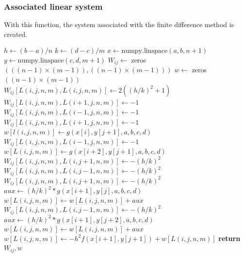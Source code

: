 \documentclass[a4paper]{article}
\begin{document}
\subsubsection{Associated linear system}
With this function, the system associated with the finite difference method is created.
\begin{algorithm}[H]
\caption{Finite Difference Linear System}\label{alg::finite_difference}
\begin{algorithmic}[H]
\State $h \gets (b-a)/n$
\State $k \gets (d-c)/m$
\State $x \gets \text{numpy.linspace}(a, b, n+1)$
\State $y \gets \text{numpy.linspace}(c, d, m+1)$
\State $W_{ij} \gets$ zeros $(((n-1)\times(m-1)),((n-1)\times(m-1)))$
\State $w \gets$ zeros $((n-1)\times(m-1))$
\State $W_{ij}[L(i,j,n,m), L(i,j,n,m)] \gets 2((h/k)^2 + 1)$
\State $W_{ij}[L(i,j,n,m), L(i+1,j,n,m)] \gets -1$
\State $W_{ij}[L(i,j,n,m), L(i-1,j,n,m)] \gets -1$
\Else
{}
\State $W_{ij}[L(i,j,n,m), L(i+1,j,n,m)] \gets -1$
\State $w[l(i,j,n,m)] \gets g(x[i], y[j+1], a, b, c, d)$
\EndIf
{}
\State $W_{ij}[L(i,j,n,m), L(i-1,j,n,m)] \gets -1$
\State $w[L(i,j,n,m)] \gets g(x[i+2], y[j+1], a, b, c, d)$
\EndIf
\EndIf
{}
\State $W_{ij}[L(i,j,n,m), L(i,j+1,n,m)] \gets-(h/k)^2$
\State $W_{ij}[L(i,j,n,m), L(i,j-1,n,m)] \gets-(h/k)^2$
\Else
{}
\State $W_{ij}[L(i,j,n,m), L(i,j+1,n,m)] \gets -(h/k)^2$
\State $aux\gets (h/k)^2*g(x[i+1],y[j],a,b,c,d)$
\State $w[L(i,j,n,m)] \gets w[L(i,j,n,m)]+ aux$
\EndIf
{}
\State $W_{ij}[L(i,j,n,m), L(i,j-1,n,m)] \gets -(h/k)^2$
\State $aux\gets (h/k)^2*g(x[i+1],y[j+2],a,b,c,d)$
\State $w[L(i,j,n,m)] \gets w[L(i,j,n,m)]+ aux$
\EndIf
\EndIf
\State $w[L(i,j,n,m)] \gets-h^2f(x[i+1],y[j+1])+w[L(i,j,n,m)]$
\EndFor
\EndFor
\State \textbf{return} $W_{ij}, w$
\EndFunction
\end{algorithmic}
\end{algorithm}
\end{document}
